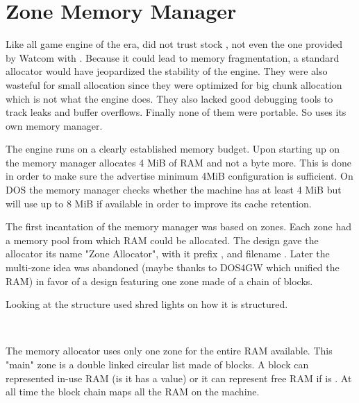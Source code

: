 \section{Zone Memory Manager}
Like all game engine of the era, \doom{}did not trust stock , not even the one provided by Watcom with . Because it could lead to memory fragmentation, a standard allocator would have jeopardized the stability of the engine. They were also wasteful for small allocation since they were optimized for big chunk allocation which is not what the engine does. They also lacked good debugging tools to track leaks and buffer overflows. Finally none of them were portable. So \doom{}uses its own memory manager.\\
\par

The engine runs on a clearly established memory budget. Upon starting up on \NeXT the memory manager allocates 4 MiB of RAM and not a byte more. This is done in order to make sure the advertise minimum 4MiB configuration is sufficient. On DOS the memory manager checks whether the machine has at least 4 MiB but will use up to 8 MiB if available in order to improve its cache retention.\\
\par
The first incantation of the memory manager was based on zones. Each zone had a memory pool from which RAM could be allocated. The design gave the allocator its name "Zone Allocator", with it prefix , and filename . Later the multi-zone idea was abandoned (maybe thanks to DOS4GW which unified the RAM) in favor of a design featuring one zone made of a chain of blocks.\\
\par
Looking at the structure used shred lights on how it is structured.\\
\par
{}\\
\par
The memory allocator uses only one zone for the entire RAM available. This "main" zone is a double linked circular list made of blocks. A block can represented in-use RAM (is it has a  value) or it can represent free RAM if  is . At all time the block chain maps all the RAM on the machine.



